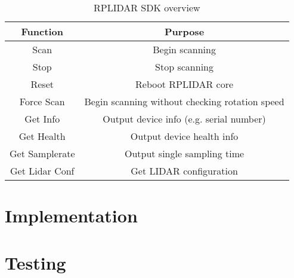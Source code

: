 		\begin{table}[h!]
			\centering
			\begin{tabular}{||c | c||} 
				\hline
				Function & Purpose  \\ [0.5ex] 
				\hline\hline
				Scan & Begin scanning  \\ 
				Stop & Stop scanning  \\
				Reset & Reboot RPLIDAR core  \\
				Force Scan & Begin scanning without checking rotation speed  \\
				Get Info & Output device info (e.g. serial number)  \\
				Get Health & Output device health info  \\
				Get Samplerate & Output single sampling time  \\
				Get Lidar Conf & Get LIDAR configuration  \\ [1ex] 
				\hline
			\end{tabular}
			\caption{RPLIDAR SDK overview}
			\label{table:2}
		\end{table}
		

		
	\chapter{Implementation}
	\chapter{Testing}